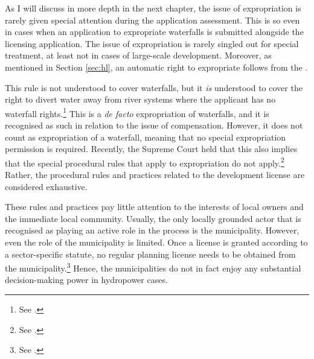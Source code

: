 %

As I will discuss in more depth in the next chapter, the issue of expropriation is rarely given special attention during the application assessment. This is so even in cases when an application to expropriate waterfalls is submitted alongside the licensing application. The issue of expropriation is rarely singled out for special treatment, at least not in cases of large-scale development. Moreover, as mentioned in Section \ref{sec:hl}, an automatic right to expropriate follows from the \cite[16]{wra17}.

This rule is not understood to cover waterfalls, but it {\it is} understood to cover the right to divert water away from river systems where the applicant has no waterfall rights.\footnote{See \cite{jorpeland11}.} This is a {\it de facto} expropriation of waterfalls, and it is recognised as such in relation to the issue of compensation. However, it does not count as expropriation of a waterfall, meaning that no special expropriation permission is required. Recently, the Supreme Court held that this also implies that the special procedural rules that apply to expropriation do not apply.\footnote{See \cite{jorpeland11}.} Rather, the procedural rules and practices related to the development license are considered exhaustive.

These rules and practices pay little attention to the interests of local owners and the immediate local community. Usually, the only locally grounded actor that is recognised as playing an active role in the process is the municipality. However, even the role of the municipality is limited. Once a license is granted according to a sector-specific statute, no regular planning license needs to be obtained from the municipality.\footnote{See \cite[12-1]{pb08}.} Hence, the municipalities do not in fact enjoy any substantial decision-making power in hydropower cases. 

